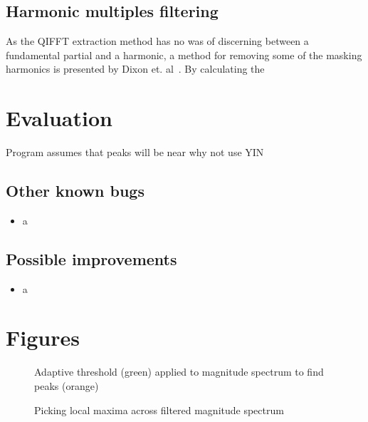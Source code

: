 \documentclass[titlepage]{scrartcl}
\begin{document}
\subsection{Harmonic multiples filtering}
As the QIFFT extraction method has no was of discerning between a fundamental
partial and a harmonic, a method for removing some of the masking harmonics is
presented by Dixon et. al~\citeyearpar{Dixon2012}. By calculating the 

\section{Evaluation}
Program assumes that peaks will be near
why not use YIN
\subsection{Other known bugs}
\begin{itemize}
    \item a
\end{itemize}

\subsection{Possible improvements}
\begin{itemize}
    \item a
\end{itemize}

\section{Figures}
\begin{figure}[H]
    \caption{Adaptive threshold (green) applied to magnitude spectrum to find
    peaks (orange)}
    \label{MeanStdPeaks}
\end{figure}
\begin{figure}[H]
    \caption{Picking local maxima across filtered magnitude spectrum}
    \label{PeakPicking}
\end{figure}
\printbibliography
\end{document}
